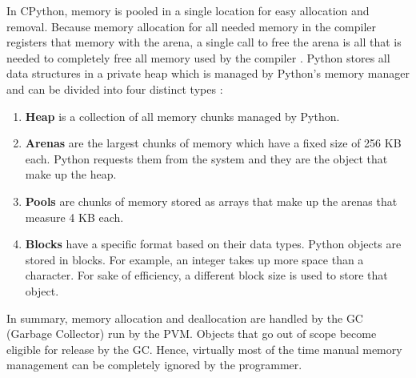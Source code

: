 In CPython, memory is pooled in a single location for easy allocation and removal.
Because memory allocation for all needed memory in the compiler registers that memory
with the arena, a single call to free the arena is all that is needed to completely
free all memory used by the compiler \autocite{python2021}. Python stores all data
structures in a private heap which is managed by Python's memory manager and can
be divided into four distinct types \autocite{zehra2020}:

\begin{enumerate}
    \item \textbf{Heap} is a collection of all memory chunks managed by Python.
    \item \textbf{Arenas} are the largest chunks of memory which have a fixed
    size of 256 KB each. Python requests them from the system and they are the
    object that make up the heap.
    \item \textbf{Pools} are chunks of memory stored as arrays that make up the
    arenas that measure 4 KB each.
    \item \textbf{Blocks} have a specific format based on their data types. Python
    objects are stored in blocks. For example, an integer takes up more space than
    a character. For sake of efficiency, a different block size is used to store
    that object. 
\end{enumerate}

In summary, memory allocation and deallocation are handled by the GC (Garbage
Collector) run by the PVM. Objects that go out of scope become eligible for
release by the GC. Hence, virtually most of the time manual memory management
can be completely ignored by the programmer.
